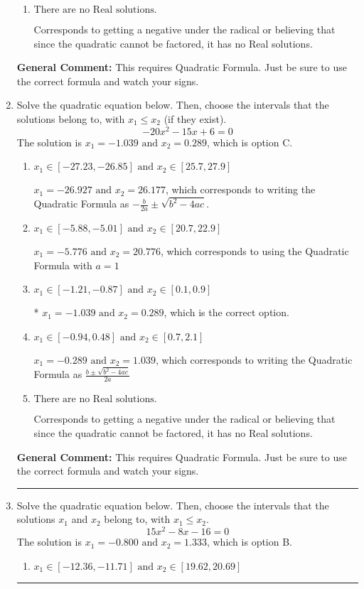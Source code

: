 \documentclass{extbook}[14pt]
\newcommand{\litem}[1]{\item #1

\rule{\textwidth}{0.4pt}}
\begin{document}
\begin{enumerate}
{\begin{enumerate}[label=\Alph*.]
 $x_1 = -24.557 \text{ and } x_2 = 24.146$, which corresponds to writing the Quadratic Formula as $-\frac{b}{2a} \pm \sqrt{b^2 - 4ac}$.
\item \( \text{There are no Real solutions.} \)

Corresponds to getting a negative under the radical or believing that since the quadratic cannot be factored, it has no Real solutions.
\end{enumerate}

\textbf{General Comment:} This requires Quadratic Formula. Just be sure to use the correct formula and watch your signs.
}
\litem{
Solve the quadratic equation below. Then, choose the intervals that the solutions belong to, with $x_1 \leq x_2$ (if they exist).
\[ -20x^{2} -15 x + 6 = 0 \]The solution is \( x_1 = -1.039 \text{ and } x_2 = 0.289 \), which is option C.\begin{enumerate}[label=\Alph*.]
\item \( x_1 \in [-27.23, -26.85] \text{ and } x_2 \in [25.7, 27.9] \)

 $x_1 = -26.927 \text{ and } x_2 = 26.177$, which corresponds to writing the Quadratic Formula as $-\frac{b}{2a} \pm \sqrt{b^2 - 4ac}$.
\item \( x_1 \in [-5.88, -5.01] \text{ and } x_2 \in [20.7, 22.9] \)

 $x_1 = -5.776 \text{ and } x_2 = 20.776$, which corresponds to using the Quadratic Formula with $a=1$
\item \( x_1 \in [-1.21, -0.87] \text{ and } x_2 \in [0.1, 0.9] \)

* $x_1 = -1.039 \text{ and } x_2 = 0.289$, which is the correct option.
\item \( x_1 \in [-0.94, 0.48] \text{ and } x_2 \in [0.7, 2.1] \)

 $x_1 = -0.289 \text{ and } x_2 = 1.039$, which corresponds to writing the Quadratic Formula as $\frac{b \pm \sqrt{b^2 - 4ac}}{2a}$
\item \( \text{There are no Real solutions.} \)

Corresponds to getting a negative under the radical or believing that since the quadratic cannot be factored, it has no Real solutions.
\end{enumerate}

\textbf{General Comment:} This requires Quadratic Formula. Just be sure to use the correct formula and watch your signs.
}
\litem{
Solve the quadratic equation below. Then, choose the intervals that the solutions $x_1$ and $x_2$ belong to, with $x_1 \leq x_2$.
\[ 15x^{2} -8 x -16 = 0 \]The solution is \( x_1 = -0.800 \text{ and } x_2 = 1.333 \), which is option B.\begin{enumerate}[label=\Alph*.]
\item \( x_1 \in [-12.36, -11.71] \text{ and } x_2 \in [19.62, 20.69] \)


\end{enumerate}}
\end{enumerate}
\end{document}
